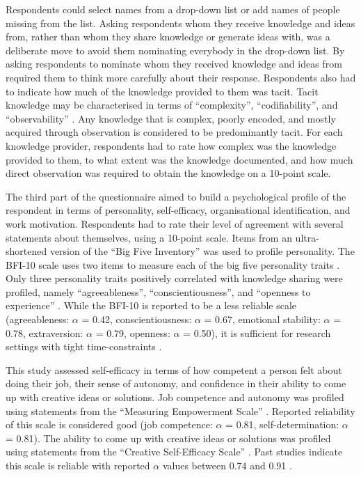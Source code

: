 Respondents could select names from a drop-down list or add names of people missing from the list. Asking respondents whom they receive knowledge and ideas from, rather than whom they share knowledge or generate ideas with, was a deliberate move to avoid them nominating everybody in the drop\hyp{}down list. By asking respondents to nominate whom they received knowledge and ideas from required them to think more carefully about their response. Respondents also had to indicate how much of the knowledge provided to them was tacit. Tacit knowledge may be characterised in terms of \enquote{complexity}, \enquote{codifiability}, and \enquote{observability} \citep{winter1987knowledge,zander1995knowledge,cavusgil2003tacit}. Any knowledge that is complex, poorly encoded, and mostly acquired through observation is considered to be predominantly tacit. For each knowledge provider, respondents had to rate how complex was the knowledge provided to them, to what extent was the knowledge documented, and how much direct observation was required to obtain the knowledge on a 10\hyp{}point scale. \medskip 

The third part of the questionnaire aimed to build a psychological profile of the respondent in terms of personality, self-efficacy, organisational identification, and work motivation. Respondents had to rate their level of agreement with several statements about themselves,  using a 10-point scale. Items from an ultra-shortened version of the \enquote{Big Five Inventory} was used to profile personality. The BFI-10 scale uses two items to measure each of the big five personality traits \citep{rammstedt2007measuring}. Only three personality traits positively correlated with knowledge sharing were profiled, namely \enquote{agreeableness}, \enquote{conscientiousness}, and \enquote{openness to experience} \citep{matzler2008personality,matzler2011personality}. While the BFI-10 is reported to be a less reliable scale (agreeableness: $\alpha$ = 0.42, conscientiousness: $\alpha$ = 0.67, emotional stability: $\alpha$ = 0.78, extraversion: $\alpha$ = 0.79, openness: $\alpha$ = 0.50), it is sufficient for research settings with tight time-constraints \citep{rammstedt2007measuring}.\medskip

This study assessed self-efficacy in terms of how competent a person felt about doing their job, their sense of autonomy, and confidence in their ability to come up with creative ideas or solutions. Job competence and autonomy was profiled using statements from the \enquote{Measuring Empowerment Scale} \citep{spreitzer1995psychological}. Reported reliability of this scale is considered good (job competence: $\alpha$ = 0.81, self-determination: $\alpha$ = 0.81). The ability to come up with creative ideas or solutions was profiled using statements from the \enquote{Creative Self\hyp{}Efficacy Scale} \citep{tierney2002creative}. Past studies indicate this scale is reliable with reported $\alpha$ values between 0.74 and 0.91 \citep{tierney2002creative,gong2009employee,tierney2011creative,mittal2015transformational}.\medskip

